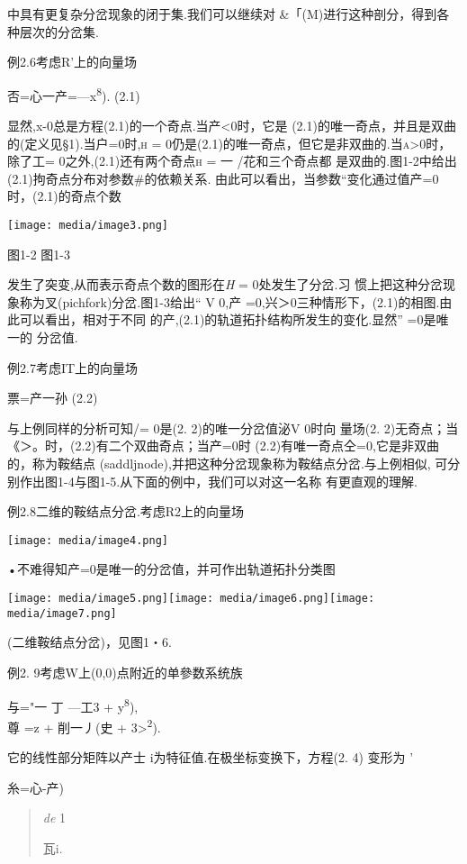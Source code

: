 \documentclass{article}
\begin{document}
中具有更复杂分岔现象的闭于集.我们可以继续对
\&「(M)进行这种剖分，得到各种层次的分岔集.

例2.6考虑R'上的向量场

否=心一产=---x\textsuperscript{8}). (2.1)

显然,x-0总是方程(2.1)的一个奇点.当产\textless{}0时，它是
(2.1)的唯一奇点，并且是双曲的(定义见§1).当户=0时,\textsc{h =}
0仍是(2.1)的唯一奇点，但它是非双曲的.当\textsc{a\textgreater{}0}时，除了工=
0之外,(2.1)还有两个奇点\textsc{h = 一} /花和三个奇点都
是双曲的.图1-2中给出(2.1)拘奇点分布对参数\#的依赖关系.
由此可以看出，当参数``变化通过值产=0时，(2.1)的奇点个数

\texttt{[image: media/image3.png]}

图1-2 图1-3

发生了突变,从而表示奇点个数的图形在\emph{H} = 0处发生了分岔.习
惯上把这种分岔现象称为叉(pichfork)分岔.图1-3给出`` V 0,产
=0,兴＞0三种情形下，(2.1)的相图.由此可以看出，相对于不同
的产,(2.1)的轨道拓扑结构所发生的变化.显然'' =0是唯一的 分岔值.

例2.7考虑IT上的向量场

票=产一孙 (2.2)

与上例同样的分析可知/= 0是(2. 2)的唯一分岔值泌V 0时向 量场(2.
2)无奇点；当《＞。时，(2.2)有二个双曲奇点；当产=0时
(2.2)有唯一奇点仝=0,它是非双曲的，称为鞍结点
(saddljnode),并把这种分岔现象称为鞍结点分岔.与上例相似,
可分别作出图1-4与图1-5.从下面的例中，我们可以对这一名称 有更直观的理解.

例2.8二维的鞍结点分岔.考虑R2上的向量场

\texttt{[image: media/image4.png]}

•不难得知产=0是唯一的分岔值，并可作出轨道拓扑分类图

\texttt{[image: media/image5.png]}\texttt{[image: media/image6.png]}\texttt{[image: media/image7.png]}

(二维鞍结点分岔)，见图1・6.

例2. 9考虑W上(0,0)点附近的单參数系统族

与="一 丁 ---工3 + y\textsuperscript{8}),\\
尊 =z + 削一丿(史 + 3\textgreater{}\textsuperscript{2}).

它的线性部分矩阵以产士 i为特征值.在极坐标变换下，方程(2. 4) 变形为 '

糸=心-产)

\begin{quote}
\emph{de} 1

瓦i.
\end{quote}
\end{document}
